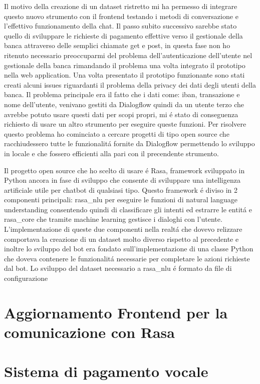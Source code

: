 Il motivo della creazione di un dataset ristretto mi ha permesso di integrare questo nuovo strumento con il frontend testando i metodi di conversazione e l'effettivo funzionamento della chat.
Il passo subito successivo sarebbe stato quello di sviluppare le richieste di pagamento effettive verso il gestionale della banca attraverso delle semplici chiamate get e post, in questa fase non ho ritenuto necessario preoccuparmi del problema dell'autenticazione dell'utente nel gestionale della banca rimandando il problema una volta integrato il prototipo nella web application.
Una volta presentato il prototipo funzionante sono stati creati alcuni issues riguardanti il problema della privacy dei dati degli utenti della banca. 
Il problema principale era il fatto che i dati come: iban, transazione e nome dell'utente, venivano gestiti da Dialogflow quindi da un utente terzo che avrebbe potuto usare questi dati per scopi propri, mi \'e stato di conseguenza richiesto di usare un altro strumento per eseguire queste funzioni.
Per risolvere questo problema ho cominciato a cercare progetti di tipo open source che racchiudessero tutte le funzionalit\'a fornite da Dialogflow permettendo lo sviluppo in locale e che fossero efficienti alla pari con il precendente strumento.

Il progetto open source che ho scelto di usare \'e Rasa, framework sviluppato in Python ancora in fase di sviluppo che consente di sviluppare una intelligenza artificiale utile per chatbot di qualsiasi tipo.
Questo framework \'e diviso in 2 componenti principali: rasa\_nlu per eseguire le funzioni di natural language understanding consentendo quindi di classificare gli intenti ed estrarre le entit\'a e rasa\_core che tramite machine learning gestisce i dialoghi con l'utente. 
L'implementazione di queste due componenti nella realt\'a che dovevo relizzare comportava la creazione di un dataset molto diverso rispetto al precedente e inoltre lo sviluppo del bot era fondato sull'implementazione di una classe Python che doveva contenere le funzionalit\'a necessarie per completare le azioni richieste dal bot.
Lo sviluppo del dataset necessario a rasa\_nlu \'e formato da file di configurazione 


\section{Aggiornamento Frontend per la comunicazione con Rasa}

\section{Sistema di pagamento vocale}

